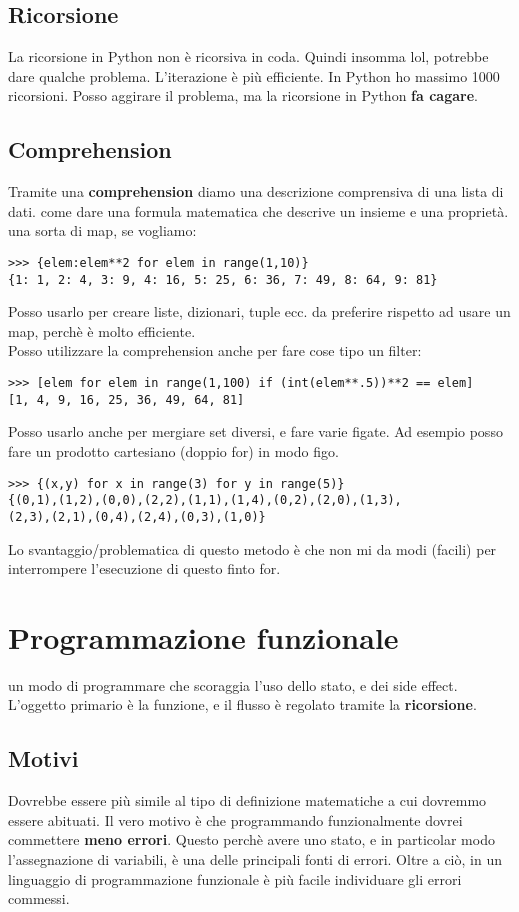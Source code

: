 \documentclass[a4paper,12pt]{article}
\begin{document}
\subsection{Ricorsione}
La ricorsione in Python non è ricorsiva in coda. Quindi insomma lol, potrebbe dare qualche problema. L'iterazione è più efficiente. In Python ho massimo 1000 ricorsioni. Posso aggirare il problema, ma la ricorsione in Python \textbf{fa cagare}.

\subsection{Comprehension}
Tramite una \textbf{comprehension} diamo una descrizione comprensiva di una lista di dati. \E come dare una formula matematica che descrive un insieme e una proprietà. \E una sorta di map, se vogliamo:
\begin{lstlisting}
>>> {elem:elem**2 for elem in range(1,10)}
{1: 1, 2: 4, 3: 9, 4: 16, 5: 25, 6: 36, 7: 49, 8: 64, 9: 81}
\end{lstlisting}
Posso usarlo per creare liste, dizionari, tuple ecc. \E da preferire rispetto ad usare un map, perchè è molto efficiente.\\
Posso utilizzare la comprehension anche per fare cose tipo un filter:
\begin{lstlisting}[caption=Espressione che crea tutti i quadrati perfetti da uno a cento]
>>> [elem for elem in range(1,100) if (int(elem**.5))**2 == elem]
[1, 4, 9, 16, 25, 36, 49, 64, 81]
\end{lstlisting}
Posso usarlo anche per mergiare set diversi, e fare varie figate. Ad esempio posso fare un prodotto cartesiano (doppio for) in modo figo.
\begin{lstlisting}
>>> {(x,y) for x in range(3) for y in range(5)}
{(0,1),(1,2),(0,0),(2,2),(1,1),(1,4),(0,2),(2,0),(1,3),
(2,3),(2,1),(0,4),(2,4),(0,3),(1,0)}
\end{lstlisting}
Lo svantaggio/problematica di questo metodo è che non mi da modi (facili) per interrompere l'esecuzione di questo finto for.

\section{Programmazione funzionale}
\E un modo di programmare che scoraggia l'uso dello stato, e dei side effect. L'oggetto primario è la funzione, e il flusso è regolato tramite la \textbf{ricorsione}.
\subsection{Motivi}
Dovrebbe essere più simile al tipo di definizione matematiche a cui dovremmo essere abituati. Il vero motivo è che programmando funzionalmente dovrei commettere \textbf{meno errori}. Questo perchè avere uno stato, e in particolar modo l'assegnazione di variabili, è una delle principali fonti di errori. Oltre a ciò, in un linguaggio di programmazione funzionale è più facile individuare gli errori commessi.
\end{document}

